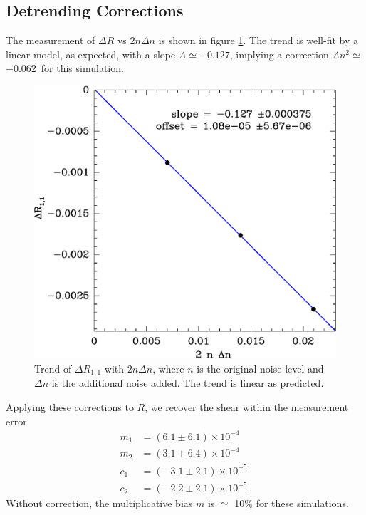 \documentclass[usegraphicx,usenatbib]{mn2e}
\newcommand{\Aslope}{$-0.127$}
\newcommand{\Rcorr}{$-0.062$}
\begin{document}
\subsection{Detrending Corrections} \label{sec:detrendsim}

The measurement of $\Delta R$ vs $2 n \Delta n$ is shown in figure
\ref{fig:detrend}.  The trend is well-fit by a linear model, as expected, with
a slope $A \simeq $\Aslope, implying a correction $A n^2 \simeq$ \Rcorr\ for this
simulation.

\begin{figure}
    \includegraphics[scale=0.45]{run-bd13mcal-dt02-Rnoise-detrend-R11.eps}

    \caption{Trend of $\Delta R_{1,1}$ with $2 n \Delta n$, where $n$ is the
    original noise level and $\Delta n$ is the additional noise added.  The
trend is linear  as predicted.}

\label{fig:detrend}
\end{figure}

Applying these corrections to $R$, we recover the shear within the
measurement error
\begin{align} \label{eq:detrendres}
    m_1 &= ( 6.1 \pm 6.1) \times 10^{-4} \nonumber \\
    m_2 &= ( 3.1 \pm 6.4) \times 10^{-4} \nonumber \\
    c_1 &= (-3.1 \pm 2.1) \times 10^{-5} \nonumber \\
    c_2 &= (-2.2 \pm 2.1) \times 10^{-5}. \nonumber
\end{align}
Without correction, the multiplicative bias $m$ is $\simeq$ 10\%
for these simulations.
\end{document}
